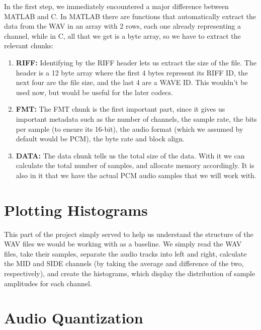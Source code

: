 In the first step, we immediately encountered a major difference between MATLAB and C. In MATLAB there are functions that automatically extract the data from the WAV in an array with 2 rows, each one already representing a channel, while in C, all that we get is a byte array, so we have to extract the relevant chunks:

\begin{enumerate}

    \item \textbf{RIFF:} Identifying by the RIFF header lets us extract the size of the file. The header is a 12 byte array where the first 4 bytes represent its RIFF ID, the next four are the file size, and the last 4 are a WAVE ID. This wouldn't be used now, but would be useful for the later codecs.

    \item \textbf{FMT:} The FMT chunk is the first important part, since it gives us important metadata such as the number of channels, the sample rate, the bits per sample (to ensure its 16-bit), the audio format (which we assumed by default would be PCM), the byte rate and block align.
    
    \item \textbf{DATA:} The data chunk tells us the total size of the data. With it we can calculate the total number of samples, and allocate memory accordingly. It is also in it that we have the actual PCM audio samples that we will work with.

\end{enumerate}

\vspace{10pt}
\section{Plotting Histograms}

This part of the project simply served to help us understand the structure of the WAV files we would be working with as a baseline. We simply read the WAV files, take their samples, separate the audio tracks into left and right, calculate the MID and SIDE channels (by taking the average and difference of the two, respectively), and create the histograms, which display the distribution of sample amplitudes for each channel.

\vspace{10pt}
\section{Audio Quantization}

